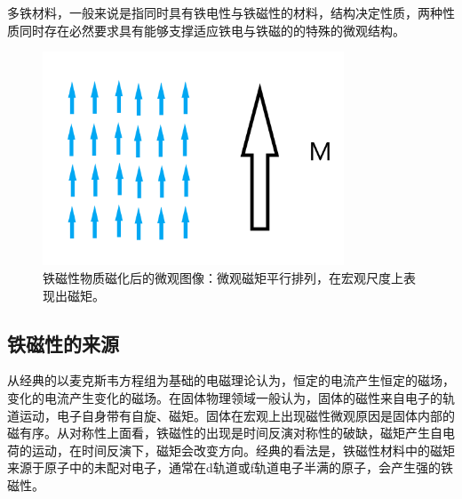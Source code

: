 多铁材料，一般来说是指同时具有铁电性与铁磁性的材料，结构决定性质，两种性质同时存在必然要求具有能够支撑适应铁电与铁磁的的特殊的微观结构。

\begin{figure}[h]
    \centering
\includegraphics[width=0.8\textwidth]{./pic/001.png}
\caption{铁磁性物质磁化后的微观图像：微观磁矩平行排列，在宏观尺度上表现出磁矩。}
\label{dog001}
\end{figure}

\subsection{铁磁性的来源}

从经典的以麦克斯韦方程组为基础的电磁理论认为，恒定的电流产生恒定的磁场，变化的电流产生变化的磁场。在固体物理领域一般认为，固体的磁性来自电子的轨道运动，电子自身带有自旋、磁矩。固体在宏观上出现磁性微观原因是固体内部的磁有序。从对称性上面看，铁磁性的出现是时间反演对称性的破缺，磁矩产生自电荷的运动，在时间反演下，磁矩会改变方向。经典的看法是，铁磁性材料中的磁矩来源于原子中的未配对电子，通常在d轨道或f轨道电子半满的原子，会产生强的铁磁性。\cite{fiebig2016the} 

